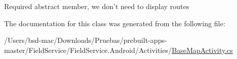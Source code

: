 Required abstract member, we don't need to display routes 



The documentation for this class was generated from the following file\+:\begin{DoxyCompactItemize}
\item 
/\+Users/bsd-\/mac/\+Downloads/\+Pruebas/prebuilt-\/apps-\/master/\+Field\+Service/\+Field\+Service.\+Android/\+Activities/\hyperlink{_base_map_activity_8cs}{Base\+Map\+Activity.\+cs}\end{DoxyCompactItemize}
